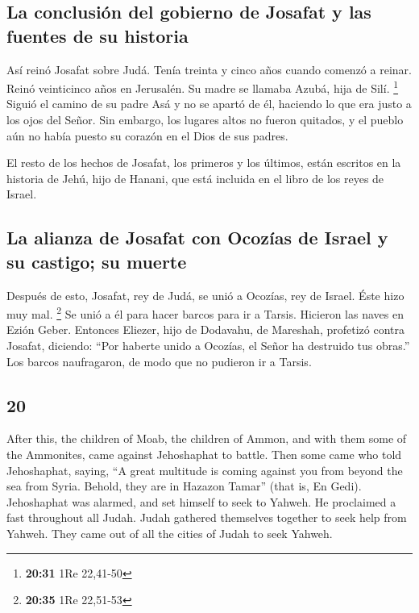 \begin{paracol}{2}
\hypertarget{la-conclusiuxf3n-del-gobierno-de-josafat-y-las-fuentes-de-su-historia}{%
\subsection{La conclusión del gobierno de Josafat y las fuentes de su
historia}\label{la-conclusiuxf3n-del-gobierno-de-josafat-y-las-fuentes-de-su-historia}}

 Así reinó Josafat sobre Judá. Tenía treinta y cinco años
cuando comenzó a reinar. Reinó veinticinco años en Jerusalén. Su madre
se llamaba Azubá, hija de Silí. \footnote{\textbf{20:31} 1Re 22,41-50}
 Siguió el camino de su padre Asá y no se apartó de él,
haciendo lo que era justo a los ojos del Señor.  Sin
embargo, los lugares altos no fueron quitados, y el pueblo aún no había
puesto su corazón en el Dios de sus padres.

 El resto de los hechos de Josafat, los primeros y los
últimos, están escritos en la historia de Jehú, hijo de Hanani, que está
incluida en el libro de los reyes de Israel.

\hypertarget{la-alianza-de-josafat-con-ocozuxedas-de-israel-y-su-castigo-su-muerte}{%
\subsection{La alianza de Josafat con Ocozías de Israel y su castigo; su
muerte}\label{la-alianza-de-josafat-con-ocozuxedas-de-israel-y-su-castigo-su-muerte}}

 Después de esto, Josafat, rey de Judá, se unió a
Ocozías, rey de Israel. Éste hizo muy mal. \footnote{\textbf{20:35} 1Re
  22,51-53}  Se unió a él para hacer barcos para ir a
Tarsis. Hicieron las naves en Ezión Geber.  Entonces
Eliezer, hijo de Dodavahu, de Mareshah, profetizó contra Josafat,
diciendo: ``Por haberte unido a Ocozías, el Señor ha destruido tus
obras.'' Los barcos naufragaron, de modo que no pudieron ir a Tarsis.

\switchcolumn
\begin{otherlanguage}{english}

\hypertarget{section-39}{%
\section{20}\label{section-39}}

 After this, the children of Moab, the children of Ammon,
and with them some of the Ammonites, came against Jehoshaphat to battle.
 Then some came who told Jehoshaphat, saying, ``A great
multitude is coming against you from beyond the sea from Syria. Behold,
they are in Hazazon Tamar'' (that is, En Gedi). 
Jehoshaphat was alarmed, and set himself to seek to Yahweh. He
proclaimed a fast throughout all Judah.  Judah gathered
themselves together to seek help from Yahweh. They came out of all the
cities of Judah to seek Yahweh.


\end{otherlanguage}
\end{paracol}

